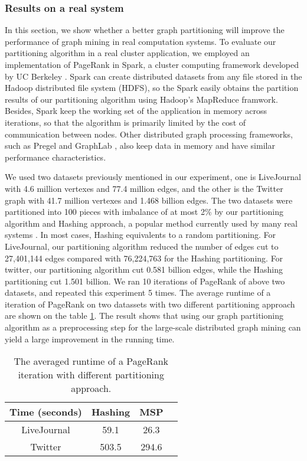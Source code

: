 \documentclass{acm_proc_article-sp}
\begin{document}
\subsubsection {Results on a real system}
In this section, we show whether a better graph partitioning will improve the performance of graph mining in real computation systems. To evaluate our partitioning algorithm in a real cluster application, we employed an implementation of PageRank in Spark, a cluster computing framework developed by UC Berkeley \cite{Berkeley:spark}. Spark can create distributed datasets from any file stored in the Hadoop distributed file system (HDFS), so the Spark easily obtains the partition results of our partitioning algorithm using Hadoop's MapReduce framwork. Besides, Spark keep the working set of the application in memory across iterations, so that the algorithm is primarily limited by the cost of communication between nodes. Other distributed graph processing frameworks, such as Pregel \cite{malewicz:pregel} and GraphLab \cite{yucheng:graphlab}, also keep data in memory and have similar performance characteristics.
\par
We used two datasets previously mentioned in our experiment, one is LiveJournal with 4.6 million vertexes and 77.4 million edges, and the other is the Twitter graph with 41.7 million vertexes and 1.468 billion edges. The two datasets were partitioned into 100 pieces with imbalance of at most 2\% by our partitioning algorithm and Hashing approach, a popular method currently used by many real systems \cite{malewicz:pregel}. In most cases, Hashing equivalents to a random partitioning. For LiveJournal, our partitioning algorithm reduced the number of edges cut to 27,401,144 edges compared with 76,224,763 for the Hashing partitioning. For twitter, our partitioning algorithm cut 0.581 billion edges, while the Hashing partitioning cut 1.501 billion. We ran 10 iterations of PageRank of above two datasets, and repeated this experiment 5 times. The average runtime of a iteration of PageRank on two datassets with two different partitioning approach are shown on the table \ref{table:par}. The result shows that using our graph partitioning algorithm as a preprocessing step for the large-scale distributed graph mining can yield a large improvement in the running time.
\begin{table}
\centering
\caption{The averaged runtime of a PageRank iteration with different partitioning approach.}
\label{table:par}
\begin{tabular}{|c|c|c|c|}
\hline
 Time (seconds)  &   Hashing   &   MSP     \\
\hline
LiveJournal          & 59.1   & 26.3    \\
\hline
Twitter         	& 503.5 	 & 294.6   \\
\hline
\end{tabular}
\end{table}
\end{document}
